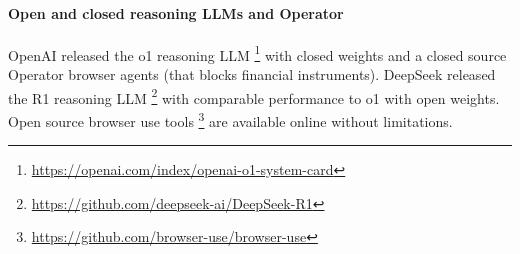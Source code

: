\paragraph{Open and closed reasoning LLMs and Operator}
OpenAI released the o1 reasoning LLM \footnote{\url{https://openai.com/index/openai-o1-system-card}} with closed weights and a closed source Operator browser agents (that blocks financial instruments). DeepSeek released the R1 reasoning LLM \footnote{\url{https://github.com/deepseek-ai/DeepSeek-R1}} with comparable performance to o1 with open weights. Open source browser use tools \footnote{\url{https://github.com/browser-use/browser-use}} are available online without limitations.
